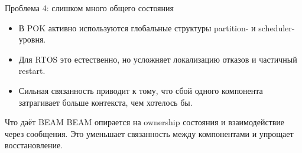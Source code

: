 \begin{frame}{Проблема 4: слишком много общего состояния}
	\begin{itemize}
		\item В POK активно используются глобальные структуры partition- и scheduler-уровня.
		\item Для RTOS это естественно, но усложняет локализацию отказов и частичный restart.
		\item Сильная связанность приводит к тому, что сбой одного компонента затрагивает больше контекста, чем хотелось бы.
	\end{itemize}
	
	\vspace{0.3cm}
	
	\begin{block}{Что даёт BEAM}
		BEAM опирается на ownership состояния и взаимодействие через сообщения.
		Это уменьшает связанность между компонентами и упрощает восстановление.
	\end{block}
\end{frame}